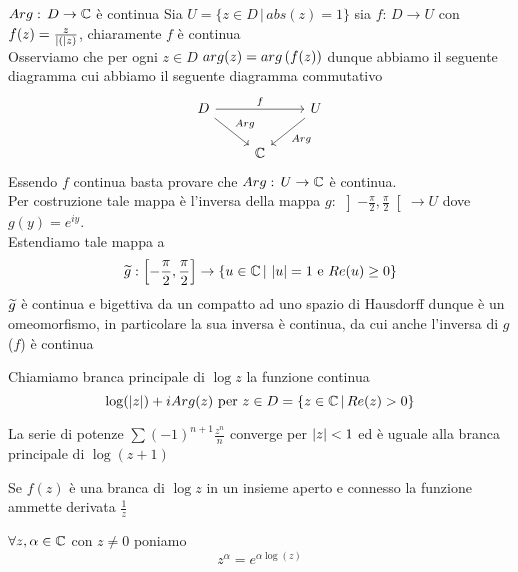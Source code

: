 \begin{prop}$Arg:\, D \to \mathbb{C}$ \`e continua
\proof Sia $U=\{ z\in D \, \vert \, abs(z)=1 \}$ sia $f:\, D \to U$ con $f(z) = \frac{z}{\left\vert ( \right\vert z)}$, chiaramente $f$ \`e continua\\
Osserviamo che  per ogni $z\in D$  $arg(z) = arg\left( f(z) \right)$ dunque abbiamo il seguente diagramma  cui abbiamo il seguente diagramma commutativo 
$$\begin{tikzcd}
D \arrow[rr,"f"] \arrow[dr,"Arg"] & & U \arrow[dl,"Arg"] \\
& \C
\end{tikzcd}$$
Essendo $f$ continua basta provare che $Arg:\, U \to \mathbb{C}$ \`e continua.\\
Per costruzione tale mappa \`e l'inversa della mappa 
$g:\, \left] -\frac{\pi}{2},\frac{\pi}{2}\right[ \to U $ dove $g(y)=e^{iy}$.\\
Estendiamo tale mappa a $$\widetilde{g} :\left[  -\frac{\pi}{2},\frac{\pi}{2} \right] \to \{ u \in \mathbb{C} \, \vert \, \left\vert u \right\vert = 1 \text{ e } Re(u) \geq 0 \}$$
$\widetilde{g}$ \`e continua e bigettiva da un compatto ad uno spazio di Hausdorff dunque \`e un omeomorfismo, in particolare la sua inversa \`e continua, da cui anche l'inversa di $g$ ($f$) \`e continua
\end{prop}
\begin{defn}Chiamiamo branca principale di $\log z$ la funzione continua
$$\log(\left\vert z \right\vert ) + i Arg(z) \text{ per } z \in D =\{  z\in \mathbb{C}\, \vert \, Re(z)>0\}$$
\end{defn} 
\spazio 
\begin{prop}La serie di potenze $\sum (-1)^{n+1} \frac{z^n}{n}$ converge per $\left\vert z \right\vert <1$ ed \`e uguale alla branca principale di $\log(z+1)$
\end{prop}
\begin{prop}Se $f(z)$ \`e una branca di $\log z$ in un insieme aperto e connesso la funzione ammette derivata $\frac{1}{z}$
\end{prop}
\begin{defn}$\forall z, \alpha \in \mathbb{C}$ con $z\neq 0 $ poniamo 
$$z^\alpha =e^{\alpha \log(z)}$$
\end{defn}
